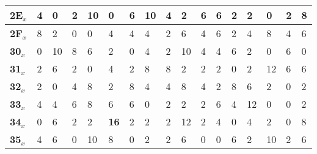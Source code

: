 \begin{longtable}[c]{|l|l|l|l|l|l|l|l|l|l|l|l|l|l|l|l|l|}
\textbf{2E$_x$} & 4              & 0              & 2              & 10             & 0              & 6              & 10             & 4              & 2              & 6              & 6              & 2              & 2              & 0              & 2              & 8              \\ \hline
\textbf{2F$_x$} & 8              & 2              & 0              & 0              & 4              & 4              & 4              & 2              & 6              & 4              & 6              & 2              & 4              & 8              & 4              & 6              \\ \hline
\textbf{30$_x$} & 0              & 10             & 8              & 6              & 2              & 0              & 4              & 2              & 10             & 4              & 4              & 6              & 2              & 0              & 6              & 0              \\ \hline
\textbf{31$_x$} & 2              & 6              & 2              & 0              & 4              & 2              & 8              & 8              & 2              & 2              & 2              & 0              & 2              & 12             & 6              & 6              \\ \hline
\textbf{32$_x$} & 2              & 0              & 4              & 8              & 2              & 8              & 4              & 4              & 8              & 4              & 2              & 8              & 6              & 2              & 0              & 2              \\ \hline
\textbf{33$_x$} & 4              & 4              & 6              & 8              & 6              & 6              & 0              & 2              & 2              & 2              & 6              & 4              & 12             & 0              & 0              & 2              \\ \hline
\textbf{34$_x$} & 0              & 6              & 2              & 2              & \textbf{16}             & 2              & 2              & 2              & 12             & 2              & 4              & 0              & 4              & 2              & 0              & 8              \\ \hline
\textbf{35$_x$} & 4              & 6              & 0              & 10             & 8              & 0              & 2              & 2              & 6              & 0              & 0              & 6              & 2              & 10             & 2              & 6              \\ \hline

\end{longtable}
